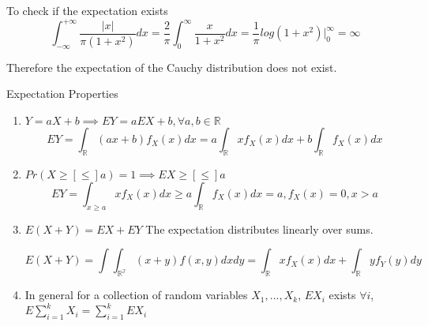 \documentclass{report}
\begin{document}
\begin{description}
\begin{mdframed}
            To check if the expectation exists
            \begin{displaymath}
                \int_{-\infty}^{+\infty}
                \frac{|x|}{\pi(1 + x^2)}
                dx
                =
                \frac{2}{\pi} \int_0^{\infty}
                \frac{x}{1+x^2} dx
                = 
                \frac{1}{\pi} log(1+x^2) \bigg |_0^{\infty} = \infty
            \end{displaymath}

            Therefore the expectation of the Cauchy distribution
            does not exist.
        \end{mdframed}
    \item {\large Expectation Properties}
       \begin{mdframed}
           \begin{enumerate}
               \item $Y = aX + b \implies EY = aEX + b, \forall a, b \in \mathbb{R}$
                   \begin{displaymath}
                       EY = \int_{\mathbb{R}} (ax + b) f_X(x) dx
                       = a \int_{\mathbb{R}} x f_X(x) dx +
                       b \int_{\mathbb{R}} f_X(x) dx
                   \end{displaymath}
                   
               \item $Pr(X \ge [\le] a) = 1 \implies EX \ge [\le] a$
                    \begin{displaymath}
                        EY = \int_{x \ge a} xf_X(x) dx \ge 
                        a \int_{\mathbb{R}} f_X(x) dx = a, f_X(x) = 0, x > a
                   \end{displaymath}
               \item $E(X+Y) = EX + EY$ The expectation distributes
                   linearly over sums.

                   \begin{displaymath}
                       E(X + Y) = \int \int_{\mathbb{R^2}} (x + y) f(x,y)dxdy
                           = \int_{\mathbb{R}} xf_X(x) dx + \int_{\mathbb{R}} yf_Y(y) dy
                   \end{displaymath}
               \item In general for a collection of random variables
                   $X_1, ... , X_k$, $EX_i$ exists $\forall i$,
                   $E \sum_{i=1}^k X_i = \sum_{i=1}^k EX_i$


\end{enumerate}
\end{mdframed}
\end{description}
\end{document}
